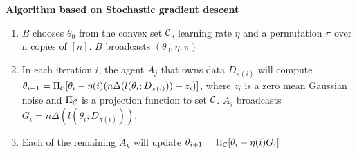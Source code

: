 \documentclass[11pt]{article}
\begin{document}
{\bf Algorithm based on Stochastic gradient descent}
\begin{enumerate}
\item $B$ chooses $\theta_{0} $ from the convex set $\cal C$, learning rate $\eta$ and a permutation $\pi$ over n copies of $[n]$. $B$ broadcasts $(\theta_{0}, \eta, \pi)$
\item In each iteration $i$, the agent $A_{j}$ that owns data $D_{\pi(i)}$ will compute $\theta_{i+1} =\Pi_{\cal C}[ \theta_{i} - \eta(i) (n \Delta(l(\theta_{i};D_{\pi(i)})) + z_{i})]$, where $z_{i} $ is a zero mean Gaussian noise and $\Pi_{\cal C}$ is a projection function to set $\cal C$. $A_{j}$ broadcasts $G_{i}=n \Delta(l(\theta_{i};D_{\pi(i)}))$.
\item Each of the remaining $A_{k}$ will update $\theta_{i+1} =\Pi_{\cal C}[ \theta_{i} - \eta(i) G_{i}] $
\end{enumerate}
\end{document}
